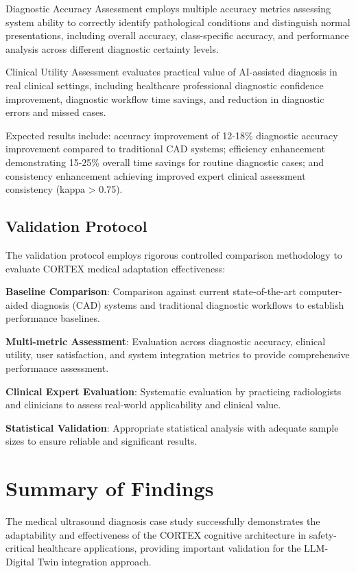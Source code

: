 Diagnostic Accuracy Assessment employs multiple accuracy metrics assessing system ability to correctly identify pathological conditions and distinguish normal presentations, including overall accuracy, class-specific accuracy, and performance analysis across different diagnostic certainty levels.

Clinical Utility Assessment evaluates practical value of AI-assisted diagnosis in real clinical settings, including healthcare professional diagnostic confidence improvement, diagnostic workflow time savings, and reduction in diagnostic errors and missed cases.

Expected results include: accuracy improvement of 12-18\% diagnostic accuracy improvement compared to traditional CAD systems; efficiency enhancement demonstrating 15-25\% overall time savings for routine diagnostic cases; and consistency enhancement achieving improved expert clinical assessment consistency (kappa > 0.75).

\subsection{Validation Protocol}

The validation protocol employs rigorous controlled comparison methodology to evaluate CORTEX medical adaptation effectiveness:

\textbf{Baseline Comparison}: Comparison against current state-of-the-art computer-aided diagnosis (CAD) systems and traditional diagnostic workflows to establish performance baselines.

\textbf{Multi-metric Assessment}: Evaluation across diagnostic accuracy, clinical utility, user satisfaction, and system integration metrics to provide comprehensive performance assessment.

\textbf{Clinical Expert Evaluation}: Systematic evaluation by practicing radiologists and clinicians to assess real-world applicability and clinical value.

\textbf{Statistical Validation}: Appropriate statistical analysis with adequate sample sizes to ensure reliable and significant results.

\section{Summary of Findings}

The medical ultrasound diagnosis case study successfully demonstrates the adaptability and effectiveness of the CORTEX cognitive architecture in safety-critical healthcare applications, providing important validation for the LLM-Digital Twin integration approach.

